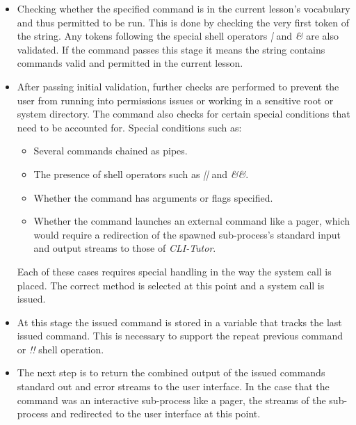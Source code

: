 \begin{itemize}

    \item Checking whether the specified command is in the current lesson's
        vocabulary and thus permitted to be run. This is done by checking the
        very first token of the string. Any tokens following the special shell
        operators \textit{|} and \textit{\&} are also validated. If the command
        passes this stage it means the string contains commands valid and
        permitted in the current lesson.


    \item After passing initial validation, further checks are performed to
        prevent the user from running into permissions issues or working in a
        sensitive root or system directory. The command also checks for
        certain special conditions that need to be accounted for. Special
        conditions such as:

        \begin{itemize}
            \item Several commands chained as pipes.
            \item The presence of shell operators such as \textit{||} and \textit{\&\&}.  
            \item Whether the command has arguments or flags specified.
            \item Whether the command launches an external command like a
                pager, which would require a redirection of the spawned
                sub-process's standard input and output streams to those of
                \textit{CLI-Tutor}.  
        \end{itemize}

        Each of these cases requires special handling in the way the system
        call is placed. The correct method is selected at this point and a
        system call is issued.

    \item At this stage the issued command is stored in a variable that tracks
        the last issued command. This is necessary to support the
        repeat previous command or \textit{!!} shell operation.

    \item The next step is to return the combined output of the issued
        commands standard out and error streams to the user interface. In the
        case that the command was an interactive sub-process like a pager, the
        streams of the sub-process and redirected to the user interface at this
        point.


\end{itemize}
